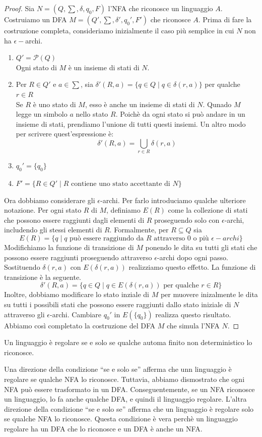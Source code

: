 \documentclass[12pt]{report}
\newcounter{corollary}
\begin{document}
	\begin{proof} Sia $N = (Q, \sum, \delta, q_0, F)$ l'NFA che riconosce un linguaggio $A$. Costruiamo un DFA $M = (Q', \sum, \delta',q_0', F')$ che riconosce $A$. Prima di fare la costruzione completa, consideriamo inizialmente il caso più semplice in cui $N$ non ha $\epsilon-$archi.
		\begin{enumerate}
			\item $Q'=\mathscr{P}(Q)$ \\
			Ogni stato di $M$ è un insieme di stati di $N$.
			\item Per $R \in Q'$ e $a\in\sum$, sia $\delta'(R, a) = \{q \in Q \mid q \in \delta(r, a)\}$ per qualche $r \in R$ \\
			Se $R$ è uno stato di $M$, esso è anche un insieme di stati di $N$. Qunado  $M$ legge un simbolo $a$ nello stato $R$. Poichè da ogni stato si può andare in un insieme di stati, prendiamo l'unione di tutti questi insiemi. Un altro modo per scrivere quest'espressione è:
			\[
			\delta'(R, a) = \bigcup_{r\in R}\delta(r, a)
			\]
			\item $q_0'= \{q_0\}$
			\item $F'=\{R \in Q' \mid R \text{ contiene uno stato accettante di } N\}$
		\end{enumerate}
	Ora dobbiamo considerare gli $\epsilon$-archi. Per farlo introduciamo qualche ulteriore notazione. Per ogni stato $R$ di $M$, definiamo $E(R)$ come la collezione di stati che possono essere raggiunti dagli elementi di $R$ proseguendo solo con $\epsilon$-archi, includendo gli stessi elementi di $R$. Formalmente, per $R \subseteq Q$ sia
	\[
	E(R) = \{q \mid q \text{ può essere raggiundo da } R \text{ attraverso 0 o più } \epsilon-archi\}
	\]
	Modifichiamo la funzione di transizione di $M$ ponendo le dita su tutti gli stati che possono essere raggiunti proseguendo attraverso $\epsilon$-archi dopo ogni passo. Sostituendo $\delta(r, a)$ con $E(\delta(r, a))$ realizziamo questo effetto.
	La funzione di transizione è la seguente.
	\[
	\delta'(R, a) = \{q \in Q \mid q \in E(\delta(r, a)) \text{ per qualche } r\in R\}
	\]
	Inoltre, dobbiamo modificare lo stato inziale di $M$ per muovere inizalmente le dita su tutti i possibili stati che possono essere raggiunti dallo stato iniziale di $N$ attraverso gli $\epsilon$-archi. Cambiare $q_0'$ in $E(\{q_0\})$ realizza questo risultato. Abbiamo così completato la costruzione del DFA $M$ che simula l'NFA $N$.
	\end{proof}
	\begin{corollary}{}{}
		Un linguaggio è regolare se e solo se qualche automa finito non deterministico lo riconosce.
	\end{corollary}
	Una direzione della condizione ``se e solo se'' afferma che unn linguaggio è regolare se qualche NFA lo riconosce. Tuttavia, abbiamo dismostrato che ogni NFA può essere trasformato in un DFA. Conseguentemente, se un NFA riconosce un linguaggio, lo fa anche qualche DFA, e quindi il linguaggio regolare. L'altra direzione della condizione ``se e solo se'' afferma che un linguaggio è regolare solo se qualche NFA lo riconosce. Questa condizione è vera perchè un linguaggio regolare ha un DFA che lo riconosce e un DFA è anche un NFA.
\end{document}
